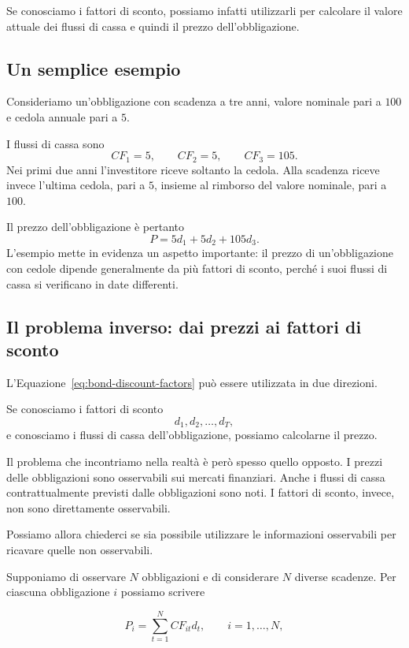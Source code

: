 Se conosciamo i fattori di sconto, possiamo infatti utilizzarli
per calcolare il valore attuale dei flussi di cassa e quindi il
prezzo dell'obbligazione.


\subsection{Un semplice esempio}

Consideriamo un'obbligazione con scadenza a tre anni, valore
nominale pari a $100$ e cedola annuale pari a $5$.

I flussi di cassa sono
$$
    CF_1=5,
    \qquad
    CF_2=5,
    \qquad
    CF_3=105.
$$
Nei primi due anni l'investitore riceve soltanto la cedola. Alla
scadenza riceve invece l'ultima cedola, pari a $5$, insieme al
rimborso del valore nominale, pari a $100$.

Il prezzo dell'obbligazione è pertanto
\begin{equation*}
    P=5d_1+5d_2+105d_3.
    \label{eq:bond-three-years}
\end{equation*}
L'esempio mette in evidenza un aspetto importante: il prezzo di
un'obbligazione con cedole dipende generalmente da più fattori di
sconto, perché i suoi flussi di cassa si verificano in date
differenti.


\subsection{Il problema inverso: dai prezzi ai fattori di sconto}

L'Equazione~\eqref{eq:bond-discount-factors} può essere utilizzata
in due direzioni.

Se conosciamo i fattori di sconto
$$
    d_1,d_2,\ldots,d_T,
$$
e conosciamo i flussi di cassa dell'obbligazione, possiamo
calcolarne il prezzo.

Il problema che incontriamo nella realtà è però spesso quello
opposto.
I prezzi delle obbligazioni sono osservabili sui mercati
finanziari. Anche i flussi di cassa contrattualmente previsti
dalle obbligazioni sono noti. I fattori di sconto, invece, non
sono direttamente osservabili.

Possiamo allora chiederci se sia possibile utilizzare le
informazioni osservabili per ricavare quelle non osservabili.

Supponiamo di osservare $N$ obbligazioni e di considerare $N$
diverse scadenze. Per ciascuna obbligazione $i$ possiamo scrivere

\begin{equation*}
    P_i=
    \sum_{t=1}^{N}CF_{it}d_t,
    \qquad
    i=1,\ldots,N,
    \label{eq:bond-general-system}
\end{equation*}

